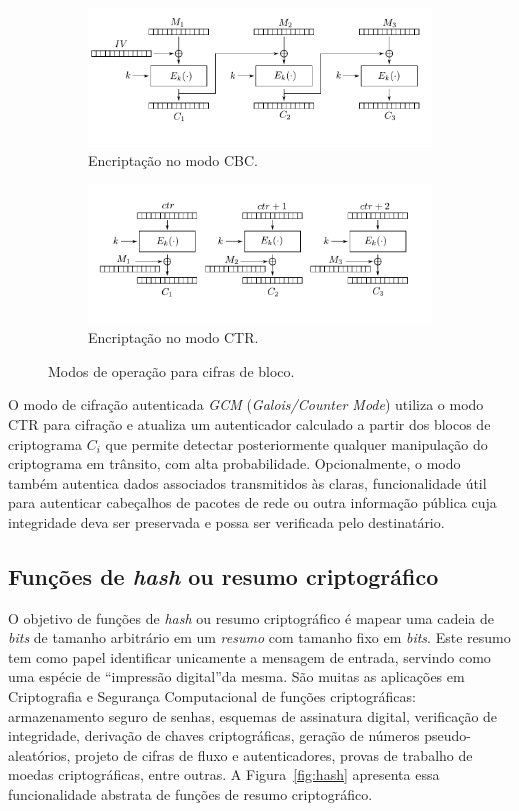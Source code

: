 \begin{figure}[h!]
\centering
\begin{subfigure}{\textwidth}
  \centering
  \includegraphics[width=.75\linewidth]{figures/cbc.pdf}
  \caption{Encriptação no modo CBC.}
  \label{fig:cbc}
\end{subfigure}
\begin{subfigure}{\textwidth}
  \centering
  \includegraphics[width=.75\linewidth]{figures/ctr.pdf}
  \caption{Encriptação no modo CTR.}
  \label{fig:ctr}
\end{subfigure}
\caption{Modos de operação para cifras de bloco.}
\label{fig:modos}
\end{figure}

O modo de cifração autenticada \emph{GCM} (\emph{Galois/Counter Mode}) utiliza o modo CTR para cifração e atualiza um autenticador calculado a partir dos blocos de criptograma $C_i$ que permite detectar posteriormente qualquer manipulação do criptograma em trânsito, com alta probabilidade. Opcionalmente, o modo também autentica dados associados transmitidos às claras, funcionalidade útil para autenticar cabeçalhos de pacotes de rede ou outra informação pública cuja integridade deva ser preservada e possa ser verificada pelo destinatário.

\subsection{Funções de \emph{hash} ou resumo criptográfico}

O objetivo de funções de \emph{hash} ou resumo criptográfico é mapear uma cadeia de \emph{bits} de tamanho arbitrário em um \emph{resumo} com tamanho fixo em \emph{bits}. Este resumo tem como papel identificar unicamente a mensagem de entrada, servindo como uma espécie de ``impressão digital''da mesma. São muitas as aplicações em Criptografia e Segurança Computacional de funções criptográficas: armazenamento seguro de senhas, esquemas de assinatura digital, verificação de integridade, derivação de chaves criptográficas, geração de números pseudo-aleatórios, projeto de cifras de fluxo e autenticadores, provas de trabalho de moedas criptográficas, entre outras. A Figura~\ref{fig:hash} apresenta essa funcionalidade abstrata de funções de resumo criptográfico.


